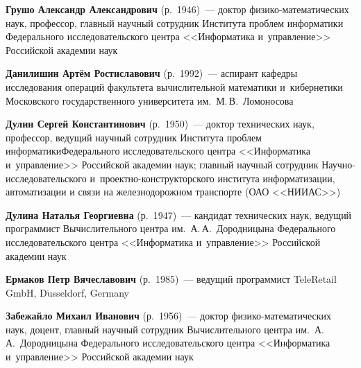 \begin{multicols}{2}

\noindent
\textbf{Грушо Александр Александрович} (р.\ 1946)~--- 
доктор фи\-зи\-ко-ма\-те\-ма\-ти\-че\-ских наук, профессор, 
главный научный сотрудник Института проб\-лем 
информатики Федерального исследовательского центра <<Информатика и~управ\-ле\-ние>>
Российской академии наук


\noindent
\textbf{Данилишин Артём Ростиславович} (р.\ 1992)~--- 
аспирант кафедры исследования операций факультета вычислительной математики 
и~кибернетики Московского государственного университета им.\ М.\,В.~Ломоносова


\noindent
\textbf{Дулин Сергей Константинович} (р.\ 1950)~--- 
доктор технических наук, профессор, ведущий научный сотрудник 
Института проблем информатики\linebreak Федерального исследовательского центра 
<<Информатика и~управ\-ле\-ние>> Российской академии наук;\linebreak 
главный научный сотрудник На\-уч\-но-ис\-сле\-до\-ва\-тель\-ско\-го 
и~про\-ект\-но-кон\-ст\-рук\-тор\-ско\-го института информатизации, 
автоматизации и связи на железнодорожном транспорте (ОАО <<НИИАС>>) 


\noindent
\textbf{Дулина Наталья Георгиевна} (р.\ 1947)~--- 
кандидат технических наук, ведущий программист Вы\-чис\-ли\-тель\-но\-го центра им.\
 А.\,А.~Дородницына Федерального исследовательского центра 
 <<Информатика и~управ\-ле\-ние>> Российской академии наук


\noindent
\textbf{Ермаков Петр Вячеславович} (р.\ 1985)~--- 
ведущий программист TeleRetail GmbH, D$\ddot{\mbox{u}}$sseldorf, Germany


\noindent
\textbf{Забежайло Михаил Иванович} (р.\ 1956)~--- доктор фи\-зи\-ко-ма\-те\-ма\-ти\-че\-ских 
 наук, доцент, главный научный сотрудник Вычислительного центра им.\
  А.\,А.~Дородницына Федерального исследовательского центра <<Информатика 
  и~управ\-ле\-ние>> Российской академии наук



\end{multicols}
